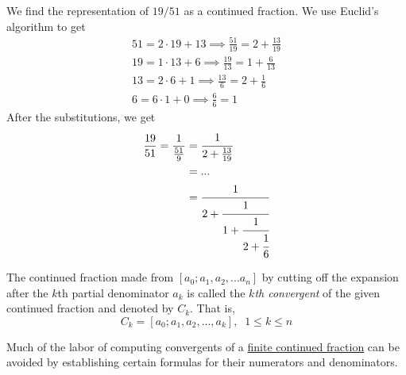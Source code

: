 \documentclass{article}
\newcounter{definition}[section]
\newcounter{example}[section]
\begin{document}
\begin{example}
  \label{ex:continued-fraction-expansion-of-1951}
We find the representation of $19/51$ as a continued fraction. We use Euclid's algorithm to get
\begin{align*}
    51 = 2 \cdot 19 + 13 \implies \frac{51}{19} = 2 + \frac{13}{19} \\
    19 = 1 \cdot 13 + 6 \implies \frac{19}{13} = 1 + \frac{6}{13} \\
    13 = 2 \cdot 6 + 1 \implies \frac{13}{6} = 2 + \frac{1}{6} \\
    6 = 6 \cdot 1 + 0 \implies \frac{6}{6} = 1
\end{align*}
After the substitutions, we get
\begin{align*}
    \frac{19}{51} = \frac{1}{\frac{51}{9}} & = \cfrac{1}{2 + \frac{13}{19}} \\
    & = ... \\
    & = \cfrac{1}{2 + \cfrac{1}{1 + \cfrac{1}{2 + \cfrac{1}{6}}}}
\end{align*}
\end{example}

\begin{definition}[$k$th Convergent]
  \label{def:kth-convergent}
The continued fraction made from $[a_0;a_1, a_2, ... a_n]$ by cutting off the expansion after the $k$th partial denominator $a_k$ is called the \textit{$k$th convergent} of the given continued fraction and denoted by $C_k$. That is, 
\begin{equation}
  C_k = [a_0;a_1, a_2, ..., a_k], \;\; 1 \leq k \leq n
\end{equation}
\end{definition}

Much of the labor of computing convergents of a \hyperref[def:finite-continued-fraction]{finite continued fraction} can be avoided by establishing certain formulas for their numerators and denominators. 
\end{document}
